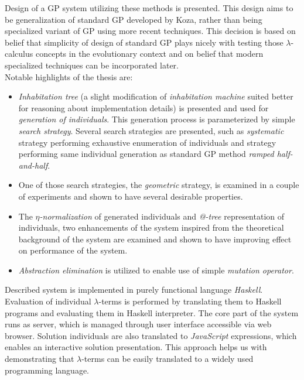 \documentclass[12pt,a4paper]{report}
\makeatletter
\newcommand{\lterms}{$\lambda$-terms\xspace}
\newcommand{\atTree}{@-tree\xspace}
\makeatother
\begin{document}
Design of a GP system utilizing these methods is presented.
This design aims to be generalization of standard GP 
developed by Koza\cite{koza92}, rather than being 
specialized variant of GP using more recent techniques.
This decision is based on belief
that simplicity of design of standard GP plays nicely
with testing those $\lambda$-calculus concepts in 
the evolutionary context and on belief that modern specialized 
techniques can be incorporated later.\\
  
Notable highlights of the thesis are: 
\begin{itemize}
 \item \textit{Inhabitation tree} (a slight modification 
   of \textit{inhabitation machine}\cite{barendregt10}
   suited better for reasoning about implementation details) 
   is presented and used for \textit{generation of individuals}.
   This generation process is parameterized by simple 
   \textit{search strategy}. Several search strategies are presented,
   such as \textit{systematic} strategy performing exhaustive enumeration
   of individuals and strategy performing same individual generation 
   as standard GP method \textit{ramped half-and-half}.  
 \item One of those search strategies, the \textit{geometric} strategy, is
   examined in a couple of experiments and shown to have 
   several desirable properties.
 \item The \textit{$\eta$-normalization} of generated individuals
       and \textit{\atTree} representation of individuals, 
       two enhancements of the system inspired from the theoretical
       background of the system are examined and shown to have 
       improving effect on performance of the system.     
 \item \textit{Abstraction elimination} is utilized
   to enable use of simple \textit{mutation operator}.

\end{itemize}

Described system is implemented in purely functional language 
\textit{Haskell}. Evaluation of individual \lterms is 
performed by translating them to
Haskell programs and evaluating them in Haskell interpreter. 
The core part of the system runs as server, which is 
managed through user interface accessible via
web browser. Solution individuals are also translated
to \textit{JavaScript} expressions, which enables  
an interactive solution presentation.
This approach helps us with demonstrating 
that \lterms can be easily translated to a 
widely used programming language.\\
\end{document}
